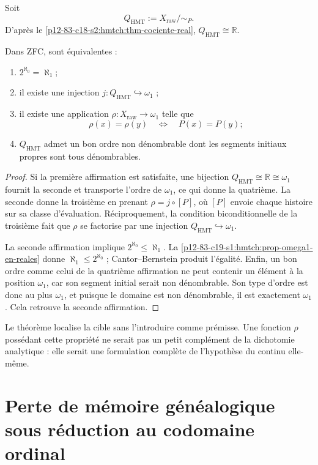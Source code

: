 Soit
\[
 Q_{\mathrm{HMT}}:=X_{\mathrm{raw}}/\!\sim_P.
\]
D'après le \cref{p12-83-c18-s2:hmtch:thm-cociente-real},
\(Q_{\mathrm{HMT}}\cong\mathbb R\).

\begin{theorem}
\label{p12-83-c19-s1:hmtch:thm-equivalencias-ch}
Dans ZFC, sont équivalentes :
\begin{enumerate}
 \item \(2^{\aleph_0}=\aleph_1\);
 \item il existe une injection \(j:Q_{\mathrm{HMT}}\hookrightarrow\omega_1\) ;
 \item il existe une application \(\rho:X_{\mathrm{raw}}\to\omega_1\) telle que
 \[
  \rho(x)=\rho(y)
  \quad\Longleftrightarrow\quad
  P(x)=P(y);
 \]
 \item \(Q_{\mathrm{HMT}}\) admet un bon ordre non dénombrable dont les segments
 initiaux propres sont tous dénombrables.
\end{enumerate}
\end{theorem}

\begin{proof}
Si la première affirmation est satisfaite, une bijection
\(Q_{\mathrm{HMT}}\cong\mathbb R\cong\omega_1\) fournit la seconde et
transporte l'ordre de \(\omega_1\), ce qui donne la quatrième. La seconde donne la
troisième en prenant \(\rho=j\circ[P]\), où \([P]\) envoie chaque histoire sur sa
classe d'évaluation. Réciproquement, la condition biconditionnelle de la troisième
fait que \(\rho\) se factorise par une injection
\(Q_{\mathrm{HMT}}\hookrightarrow\omega_1\).

La seconde affirmation implique
\(2^{\aleph_0}\leq\aleph_1\). La
\cref{p12-83-c19-s1:hmtch:prop-omega1-en-reales} donne
\(\aleph_1\leq2^{\aleph_0}\) ; Cantor--Bernstein produit l'égalité.
Enfin, un bon ordre comme celui de la quatrième affirmation ne peut contenir un
élément à la position \(\omega_1\), car son segment initial serait non
dénombrable. Son type d'ordre est donc au plus \(\omega_1\), et puisque
le domaine est non dénombrable, il est exactement \(\omega_1\). Cela retrouve la
seconde affirmation.
\end{proof}

Le théorème localise la cible sans l'introduire comme prémisse. Une fonction
\(\rho\) possédant cette propriété ne serait pas un petit complément de la dichotomie
analytique : elle serait une formulation complète de l'hypothèse du
continu elle-même.

\section{Perte de mémoire généalogique sous réduction au codomaine ordinal}

